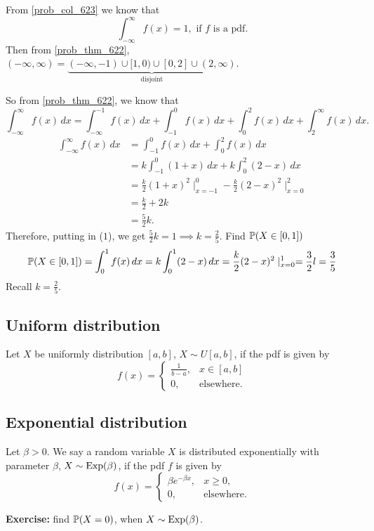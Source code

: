 \documentclass[10pt, a4paper]{article}
\begin{document}
From \autoref{prob_col_623} we know that
\begin{equation}
    \int_{-\infty}^{\infty}f(x) = 1,\text{ if } f \text{ is a pdf}.
\end{equation}
Then from \autoref{prob_thm_622},
$(-\infty, \infty) = \underbrace{(-\infty, -1) \cup [1, 0) \cup [0, 2] \cup (2, \infty)}_{\text{disjoint}}$.

So from \autoref{prob_thm_622},
we know that
\[
\int_{-\infty}^{\infty}f(x)\,dx = \int_{-\infty}^{-1}f(x)\,dx + \int_{-1}^0f(x)\,dx + \int_0^2f(x)\,dx + \int_2^{\infty}f(x)\,dx.
\]
\begin{align*}
    \int_{-\infty}^{\infty}f(x)\,dx &= \int_{-1}^{0}f(x)\,dx + \int_0^2f(x)\,dx \\
    &= k\int_{-1}^0(1 + x)\,dx + k\int_0^2(2 - x)\,dx \\
    &= \frac{k}{2}(1 + x) ^ 2\mid^0_{x = -1} - \frac{k}{2}(2 - x) ^ 2\mid^2_{x = 0} \\
    &= \frac{k}{2} + 2k \\
    &= \frac{5}{2}k.
\end{align*}
Therefore,
putting in ($1$),
we get $\frac{5}{2}k = 1 \implies k = \frac{2}{5}$.
Find $\P(X \in [0, 1])$
\[
\P(X \in [0, 1]) = \int_0^1f(x)\,dx = k\int_0^1(2 - x)\,dx = \frac{k}{2}(2 - x) ^ 2\mid_{x = 0}^1 = \frac{3}{2}l = \frac{3}{5}
\]
Recall $k = \frac{2}{5}$.

\subsection{Uniform distribution}
\begin{definition}
    Let $X$ be uniformly distribution $[a, b]$,
    $X \sim U[a, b]$,
    if the pdf is given by
    \[
    f(x) = \begin{cases}
        \frac{1}{b - a}, & x \in [a, b] \\
        0, & \text{elsewhere}.
    \end{cases}
    \]
\end{definition}

\subsection{Exponential distribution}
\begin{definition}
    Let $\beta > 0$.
    We say a random variable $X$ is distributed exponentially with parameter $\beta$,
    $X \sim \Exp(\beta)$,
    if the pdf $f$ is given by
    \[
    f(x) = \begin{cases}
        \beta e ^ {-\beta x}, & x \geq 0, \\
        0, & \text{elsewhere}.
    \end{cases}
    \]
\end{definition}
\textbf{Exercise:} find $\P(X = 0)$,
when $X \sim \Exp(\beta)$.
\end{document}
